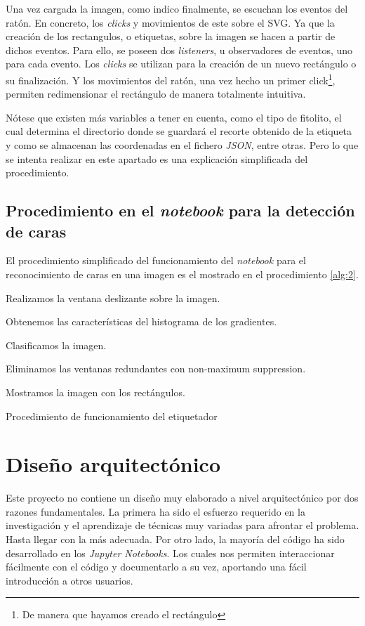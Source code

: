 Una vez cargada la imagen, como indico finalmente, se escuchan los eventos del ratón. En concreto, los \textit{clicks} y movimientos de este sobre el SVG. Ya que la creación de los rectangulos, o etiquetas, sobre la imagen se hacen a partir de dichos eventos. Para ello, se poseen dos \textit{listeners}, u observadores de eventos, uno para cada evento. Los \textit{clicks} se utilizan para la creación de un nuevo rectángulo o su finalización. Y los movimientos del ratón, una vez hecho un primer click\footnote{De manera que hayamos creado el rectángulo}, permiten redimensionar el rectángulo de manera totalmente intuitiva.

Nótese que existen más variables a tener en cuenta, como el tipo de fitolito, el cual determina el directorio donde se guardará el recorte obtenido de la etiqueta y como se almacenan las coordenadas en el fichero \textit{JSON}, entre otras. Pero lo que se intenta realizar en este apartado es una explicación simplificada del procedimiento.

\subsection{Procedimiento en el \textit{notebook} para la detección de caras}

El procedimiento simplificado del funcionamiento del \textit{notebook} para el reconocimiento de caras en una imagen es el mostrado en el procedimiento \ref{alg:2}.

\begin{algorithm}
    Realizamos la ventana deslizante sobre la imagen.    
    
    Obtenemos las características del histograma de los gradientes.

	Clasificamos la imagen.    
    
    Eliminamos las ventanas redundantes con non-maximum suppression.

    Mostramos la imagen con los rectángulos.
    \caption{Procedimiento de funcionamiento del etiquetador}
    \label{alg:2}
\end{algorithm}

\section{Diseño arquitectónico}

Este proyecto no contiene un diseño muy elaborado a nivel arquitectónico por dos razones fundamentales. La primera ha sido el esfuerzo requerido en la investigación y el aprendizaje de técnicas muy variadas para afrontar el problema. Hasta llegar con la más adecuada. Por otro lado, la mayoría del código ha sido desarrollado en los \textit{Jupyter Notebooks}. Los cuales nos permiten interaccionar fácilmente con el código y documentarlo a su vez, aportando una fácil introducción a otros usuarios.

